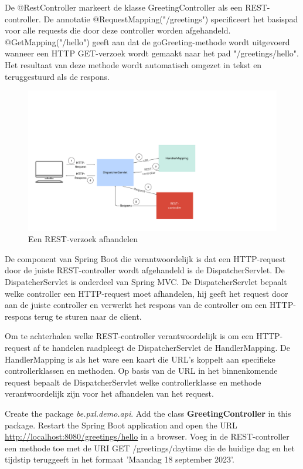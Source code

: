 De @RestController markeert de klasse GreetingController als een REST-controller.
De annotatie @RequestMapping("/greetings") specificeert het basispad voor alle requests die door deze controller worden afgehandeld.
@GetMapping("/hello") geeft aan dat de goGreeting-methode wordt uitgevoerd wanneer een HTTP GET-verzoek wordt gemaakt naar het pad "/greetings/hello". Het resultaat van deze methode wordt automatisch omgezet in tekst en teruggestuurd als de respons.

\begin{figure}[H]
  \includegraphics[width=\linewidth]{images/chapter-rest/dispatcherservlet.png}
  \caption{Een REST-verzoek afhandelen}
  \label{fig:test_passed}
\end{figure}

De component van Spring Boot die verantwoordelijk is dat een HTTP-request door de juiste REST-controller wordt afgehandeld is de DispatcherServlet.  De DispatcherServlet is onderdeel van Spring MVC.  De DispatcherServlet bepaalt welke controller een HTTP-request moet afhandelen,  hij geeft het request door aan de juiste controller en  verwerkt het respons van de controller om een HTTP-respons terug te sturen naar de client.

Om te achterhalen welke REST-controller verantwoordelijk is om een HTTP-request af te handelen raadpleegt de DispatcherServlet de HandlerMapping. De HandlerMapping is als het ware een kaart die URL's koppelt aan specifieke controllerklassen en methoden.
Op basis van de URL in het binnenkomende request bepaalt de DispatcherServlet welke controllerklasse en methode verantwoordelijk zijn voor het afhandelen van het request.


\begin{oefening}
Create the package \textit{be.pxl.demo.api}. Add the class \textbf{GreetingController} in this package. Restart the Spring Boot application and open the URL \url{http://localhost:8080/greetings/hello} in a browser. Voeg in de REST-controller een methode toe met de URI GET /greetings/daytime die de huidige dag en het tijdstip teruggeeft in het formaat 'Maandag 18 september 2023'.
\end{oefening}

